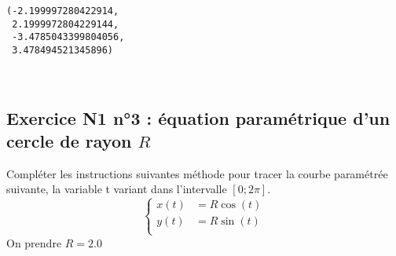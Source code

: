 \documentclass[11pt]{article}
\makeatletter
\newcommand{\boxspacing}{\kern\kvtcb@left@rule\kern\kvtcb@boxsep}
\newcommand{\prompt}[4]{
        \ttfamily\llap{{\color{#2}[#3]:\hspace{3pt}#4}}\vspace{-\baselineskip}
    }
\makeatother
\begin{document}
            \begin{tcolorbox}[breakable, size=fbox, boxrule=.5pt, pad at break*=1mm, opacityfill=0]
\prompt{Out}{outcolor}{189}{\boxspacing}
\begin{Verbatim}[commandchars=\\\{\}]
(-2.199997280422914,
 2.1999972804229144,
 -3.4785043399804056,
 3.478494521345896)
\end{Verbatim}
\end{tcolorbox}
        
    \begin{center}
    \end{center}
    { \hspace*{\fill} \\}
    
    \hypertarget{exercice-n1-n3-uxe9quation-paramuxe9trique-dun-cercle-de-rayon-r}{%
\subsection{\texorpdfstring{Exercice N1 n°3 : équation paramétrique d'un
cercle de rayon
\(R\)}{Exercice N1 n°3 : équation paramétrique d'un cercle de rayon R}}\label{exercice-n1-n3-uxe9quation-paramuxe9trique-dun-cercle-de-rayon-r}}

Compléter les instructions suivantes méthode pour tracer la courbe
paramétrée suivante, la variable t variant dans l'intervalle
\([0;2\pi]\). \[\left\{
\begin{array}{ll}
        x(t) &= R \cos(t) \\
        y(t) & =R \sin(t) \\
    \end{array}
    \right.\] On prendre \(R=2.0\)
\end{document}
